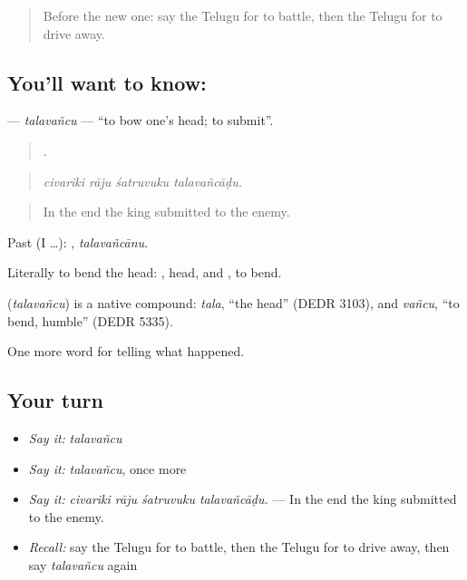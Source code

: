 \label{lesson:TE-C362-talavancu}



\begin{quote}
Before the new one: say the Telugu for to battle, then the Telugu for to drive away.
\end{quote}

\subsection*{You'll want to know: }
\textbf{} — \emph{talavañcu} — \textquotedblleft{}to bow one's head; to submit\textquotedblright{}.

\begin{quote}
   .
\end{quote}

\begin{quote}
\emph{civariki rāju śatruvuku talavañcāḍu.}
\end{quote}

\begin{quote}
In the end the king submitted to the enemy.
\end{quote}

Past (I …): , \emph{talavañcānu}.

Literally to bend the head: , head, and , to bend.

\begin{cousinweb}
\textbf{} (\emph{talavañcu}) is a native compound: \emph{tala}, \textquotedblleft{}the head\textquotedblright{} (DEDR 3103), and \emph{vañcu}, \textquotedblleft{}to bend, humble\textquotedblright{} (DEDR 5335).
\end{cousinweb}

\begin{grammarlens}[title={What you've built}]
One more word for telling what happened.
\end{grammarlens}

\subsection*{Your turn}
\begin{itemize}
\raggedright
  \item \emph{Say it:} \emph{talavañcu}
  \item \emph{Say it:} \emph{talavañcu}, once more
  \item \emph{Say it:} \emph{civariki rāju śatruvuku talavañcāḍu.} — In the end the king submitted to the enemy.
  \item \emph{Recall:} say the Telugu for to battle, then the Telugu for to drive away, then say \emph{talavañcu} again
\end{itemize}

